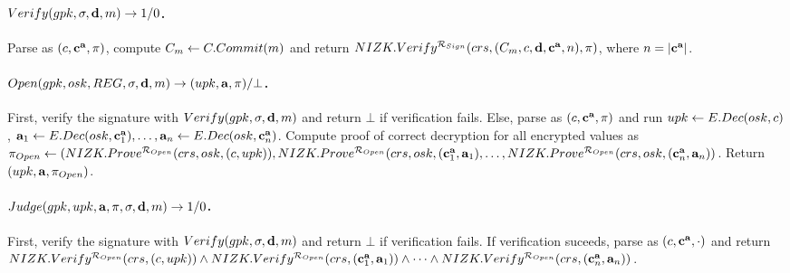 \paragraph{$Verify(gpk,\sigma,\mathbf{d},m) \rightarrow 1/0$.} %
Parse \sig as $(c,\mathbf{c}^{\mathbf{a}},\pi)$, compute $C_{m} \gets
C.Commit(m)$ and return $NIZK.Verify^{\mathcal{R}_{Sign}}(crs,(C_{m},c,
\mathbf{d},\mathbf{c}^{\mathbf{a}},n),\pi)$, where $n=|\mathbf{c}^{\mathbf{a}}|$.

\paragraph{$\Open(\gpk,\osk,\trans,\sig,\dattrs,\msg)
  \rightarrow (\upk,\attrs,\oproof)/\bot$.} %
First, verify the signature with $Verify(gpk,\sigma,\mathbf{d},m)$ and
return $\bot$ if verification fails. Else, parse \sig as $(c,\mathbf{c}^{\mathbf{a}},
\pi)$ and run $upk \gets E.Dec(osk,c)$, $\mathbf{a}_1 \gets E.Dec(osk,
\mathbf{c}_1^{\mathbf{a}}), \dots, \mathbf{a}_n \gets E.Dec(osk,\mathbf{c}_n^{\mathbf{a}})$. Compute
proof of correct decryption for all encrypted values as
$\pi_{Open} \gets (NIZK.Prove^{\mathcal{R}_{Open}}(crs,osk,(c,
upk)),NIZK.Prove^{\mathcal{R}_{Open}}(crs,osk,(\mathbf{c}_1^{\mathbf{a}},\mathbf{a}_1),
\dots,NIZK.Prove^{\mathcal{R}_{Open}}(crs,osk,(\mathbf{c}_n^{\mathbf{a}},\mathbf{a}_n))$.
Return $(upk,\mathbf{a},\pi_{Open})$.

\paragraph{$Judge(gpk,upk,\mathbf{a},\pi,\sigma,\mathbf{d},m)
  \rightarrow 1/0$.} %
First, verify the signature with $Verify(gpk,\sigma,\mathbf{d},m)$ and
return $\bot$ if verification fails. If verification suceeds, parse
\sig as $(c,\mathbf{c}^{\mathbf{a}},\cdot)$ and return
$NIZK.Verify^{\mathcal{R}_{Open}}(crs,(c,upk)) \land
NIZK.Verify^{\mathcal{R}_{Open}}(crs,(\mathbf{c}_1^{\mathbf{a}},\mathbf{a}_1)) \land
\dots \land
NIZK.Verify^{\mathcal{R}_{Open}}(crs,(\mathbf{c}_n^{\mathbf{a}},\mathbf{a}_n))$.


